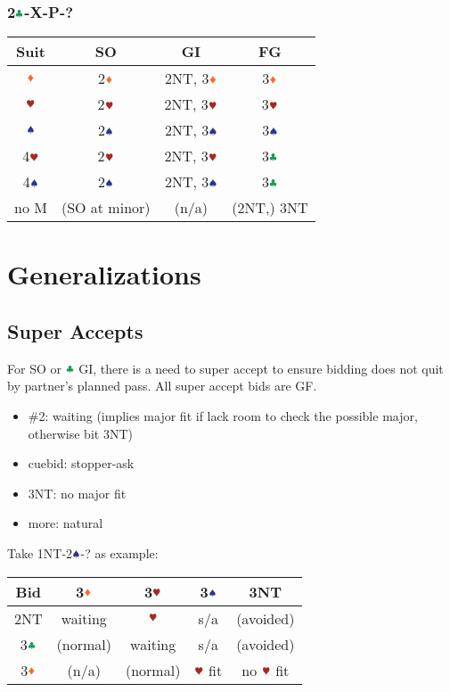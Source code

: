 \documentclass{article}
\begin{document}
\begin{multicols}{2}
\subsubsection{2$\ccc$-X-P-?}
\begin{tabular}{c|c|c|c}
    \hline
    Suit & SO & GI & FG \\ \hline\hline
    $\ddd$ & 2$\ddd$ & 2NT, 3$\ddd$ & 3$\ddd$ \\ \hline
    $\hhh$ & 2$\hhh$ & 2NT, 3$\hhh$ & 3$\hhh$ \\ \hline
    $\sss$ & 2$\sss$ & 2NT, 3$\sss$ & 3$\sss$ \\ \hline
    4$\hhh$ & 2$\hhh$ & 2NT, 3$\hhh$ & 3$\ccc$ \\ \hline
    4$\sss$ & 2$\sss$ & 2NT, 3$\sss$ & 3$\ccc$ \\ \hline
    no M & (SO at minor) & (n/a) & (2NT,) 3NT \\ \hline
\end{tabular}

\section{Generalizations}
\subsection{Super Accepts}
For SO or $\ccc$ GI, there is a need to super accept to ensure bidding does not quit by partner's planned pass. All super accept bids are GF.
\begin{itemize}
    \item \#2: waiting (implies major fit if lack room to check the possible major, otherwise bit 3NT)
    \item cuebid: stopper-ask
    \item 3NT: no major fit
    \item more: natural
\end{itemize}

\noindent Take 1NT-2$\sss$-? as example: \\
\begin{tabular}{c|c|c|c|c}
    \hline
    Bid & 3$\ddd$ & 3$\hhh$ & 3$\sss$ & 3NT \\ \hline\hline
    2NT & waiting & $\hhh$ & s/a & (avoided) \\ \hline
    3$\ccc$ & (normal) & waiting & s/a & (avoided) \\ \hline
    3$\ddd$ & (n/a) & (normal) & $\hhh$ fit & no $\hhh$ fit \\ \hline
\end{tabular}


\end{multicols}
\end{document}
